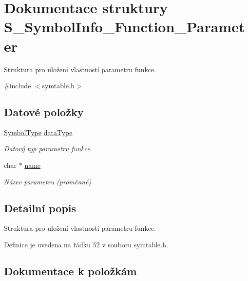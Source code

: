 \hypertarget{struct_s___symbol_info___function___parameter}{}\section{Dokumentace struktury S\+\_\+\+Symbol\+Info\+\_\+\+Function\+\_\+\+Parameter}
\label{struct_s___symbol_info___function___parameter}


Struktura pro uložení vlastností parametru funkce.  




{\ttfamily \#include $<$symtable.\+h$>$}

\subsection*{Datové položky}
\begin{DoxyCompactItemize}
\item 
\hyperlink{symtable_8h_a623952f6aa67a355a3840e25272b1c91}{Symbol\+Type} \hyperlink{struct_s___symbol_info___function___parameter_af756a2b49adaf952b3035eafa97ad150}{data\+Type}
\begin{DoxyCompactList}\small\item\em Datový typ parametru funkce. \end{DoxyCompactList}\item 
char $\ast$ \hyperlink{struct_s___symbol_info___function___parameter_a5ac083a645d964373f022d03df4849c8}{name}
\begin{DoxyCompactList}\small\item\em Název parametru (proměnné) \end{DoxyCompactList}\end{DoxyCompactItemize}


\subsection{Detailní popis}
Struktura pro uložení vlastností parametru funkce. 

Definice je uvedena na řádku 52 v souboru symtable.\+h.



\subsection{Dokumentace k položkám}
\mbox{\label{struct_s___symbol_info___function___parameter_af756a2b49adaf952b3035eafa97ad150}} 
